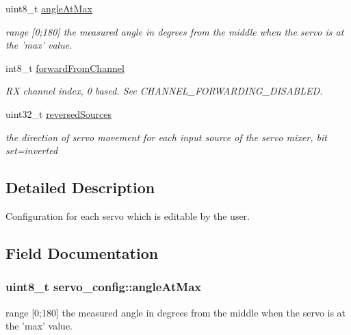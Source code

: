 \begin{DoxyCompactItemize}
uint8\+\_\+t \hyperlink{structservo__config_a87ecdbbc2d846ce9f88ea16f70ae0487}{angle\+At\+Max}
\begin{DoxyCompactList}\small\item\em range \mbox{[}0;180\mbox{]} the measured angle in degrees from the middle when the servo is at the 'max' value. \end{DoxyCompactList}\item 
int8\+\_\+t \hyperlink{structservo__config_a6996b5fd6729b2ce566f355c4e62bd4e}{forward\+From\+Channel}
\begin{DoxyCompactList}\small\item\em R\+X channel index, 0 based. See C\+H\+A\+N\+N\+E\+L\+\_\+\+F\+O\+R\+W\+A\+R\+D\+I\+N\+G\+\_\+\+D\+I\+S\+A\+B\+L\+E\+D. \end{DoxyCompactList}\item 
uint32\+\_\+t \hyperlink{structservo__config_ae8aa38f21749724eaf11abad725454a8}{reversed\+Sources}
\begin{DoxyCompactList}\small\item\em the direction of servo movement for each input source of the servo mixer, bit set=inverted \end{DoxyCompactList}\end{DoxyCompactItemize}


\subsection{Detailed Description}
Configuration for each servo which is editable by the user. 

\subsection{Field Documentation}
\hypertarget{structservo__config_a87ecdbbc2d846ce9f88ea16f70ae0487}{
\subsubsection[{angle\+At\+Max}]{\setlength{\rightskip}{0pt plus 5cm}uint8\+\_\+t servo\+\_\+config\+::angle\+At\+Max}}\label{structservo__config_a87ecdbbc2d846ce9f88ea16f70ae0487}


range \mbox{[}0;180\mbox{]} the measured angle in degrees from the middle when the servo is at the 'max' value. 

